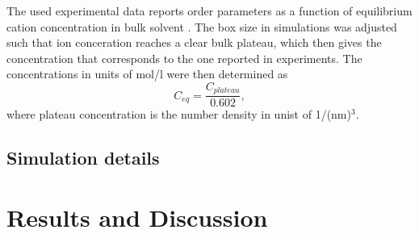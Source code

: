 \documentclass[aip,jcp,twocolumn]{revtex4}
\begin{document}
The used experimental data reports order parameters as a function of
equilibrium cation concentration in bulk solvent \cite{akutsu81,altenbach84}.
The box size in simulations was adjusted such that ion conceration reaches 
a clear bulk plateau, which then gives the concentration that corresponds to the
one reported in experiments. The concentrations in units of mol/l were then 
determined as
\begin{equation}
  C_{eq}=\frac{C_{plateau}}{0.602},
\end{equation}
where plateau concentration is the number density in unist of 1/(nm)$^3$.

\subsection{Simulation details}


\section{Results and Discussion}
\end{document}
